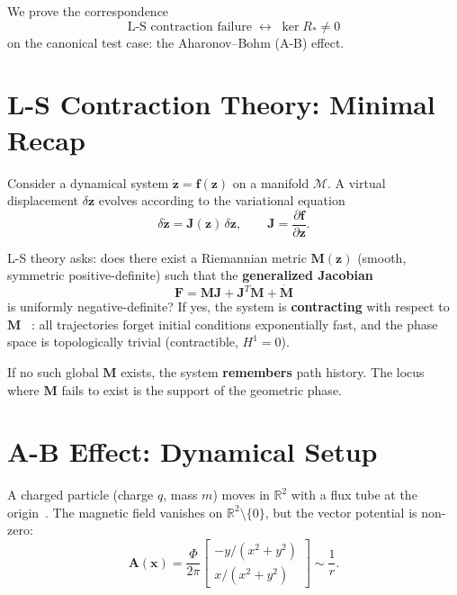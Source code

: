 \documentclass[11pt]{article}
\begin{document}
We prove the correspondence
\[
\text{L-S contraction failure} \;\longleftrightarrow\; \ker R_* \neq 0
\]
on the canonical test case: the Aharonov--Bohm (A-B) effect.

\section{L-S Contraction Theory: Minimal Recap}
\label{sec:ls-recap}

Consider a dynamical system $\dot{\mathbf{z}} = \mathbf{f}(\mathbf{z})$ on a manifold $\mathcal{M}$. A virtual displacement $\delta\mathbf{z}$ evolves according to the variational equation
\[
\delta\dot{\mathbf{z}} = \mathbf{J}(\mathbf{z}) \,\delta\mathbf{z}, \qquad
\mathbf{J} = \frac{\partial \mathbf{f}}{\partial \mathbf{z}}.
\]

L-S theory asks: does there exist a Riemannian metric $\mathbf{M}(\mathbf{z})$
(smooth, symmetric positive-definite) such that the \textbf{generalized Jacobian}
\[
\mathbf{F} = \mathbf{M}\mathbf{J} + \mathbf{J}^T\mathbf{M} + \dot{\mathbf{M}}
\]
is uniformly negative-definite? If yes, the system is \textbf{contracting} with
respect to $\mathbf{M}$~ \cite{LohmillerSlotine1998}: all trajectories forget
initial conditions exponentially fast, and the phase space is topologically
trivial (contractible, $H^1 = 0$).

If no such global $\mathbf{M}$ exists, the system \textbf{remembers} path history.
The locus where $\mathbf{M}$ fails to exist is the support of the geometric phase.

\section{A-B Effect: Dynamical Setup}
\label{sec:ab-setup}

A charged particle (charge $q$, mass $m$) moves in $\mathbb{R}^2$ with a flux
tube at the origin~\cite{AharonovBohm1959}. The magnetic field vanishes on
$\mathbb{R}^2 \setminus \{0\}$, but the vector potential is non-zero:
\[
\mathbf{A}(\mathbf{x}) =
\frac{\Phi}{2\pi}
\begin{bmatrix} -y/(x^2+y^2) \\ x/(x^2+y^2) \end{bmatrix}
\sim \frac{1}{r}.
\]
\end{document}
